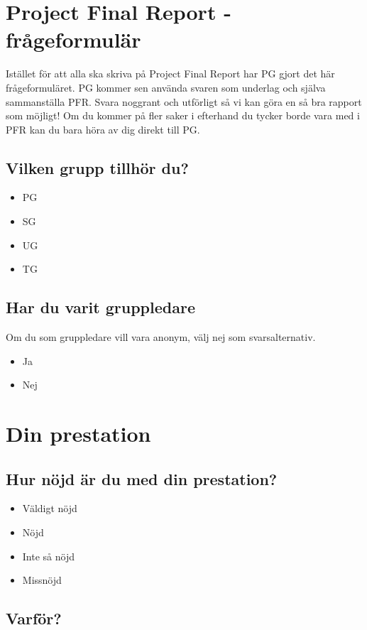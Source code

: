 \documentclass[10pt,a4paper]{article}
\author{Linnea Claesson}
\begin{document}
\section*{Project Final Report - frågeformulär}
Istället för att alla ska skriva på Project Final Report har PG gjort det här frågeformuläret. PG kommer sen använda svaren som underlag och själva sammanställa PFR. Svara noggrant och utförligt så vi kan göra en så bra rapport som möjligt! Om du kommer på fler saker i efterhand du tycker borde vara med i PFR kan du bara höra av dig direkt till PG.

\subsection*{Vilken grupp tillhör du?}
\begin{itemize}
\item PG
\item SG
\item UG
\item TG
\end{itemize}

\subsection*{Har du varit gruppledare}
Om du som gruppledare vill vara anonym, välj nej som svarsalternativ.
\begin{itemize}
\item Ja
\item Nej
\end{itemize}

\section*{Din prestation}
\subsection*{Hur nöjd är du med din prestation?}
\begin{itemize}
\item Väldigt nöjd
\item Nöjd
\item Inte så nöjd
\item Missnöjd
\end{itemize}

\subsection*{Varför?}
\end{document}
